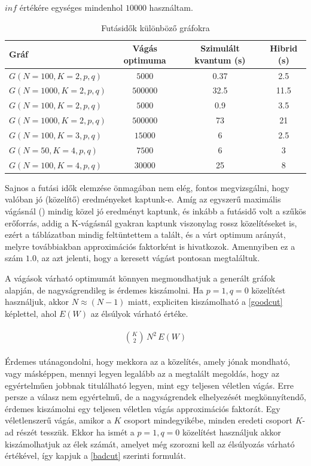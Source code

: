 $inf$ értékére egységes mindenhol $10000$ használtam.

\begin{table}[ht]
	\footnotesize
	\centering
	\begin{tabular}{ l c c c }
		\toprule
		Gráf & Vágás optimuma & Szimulált kvantum (s) & Hibrid (s) \\
		\midrule
		$G(N=100, K=2, p, q)$ & $5000$ & 0.37 & 2.5   \\
		$G(N=1000, K=2, p, q)$ & $500000$ & 32.5 & 11.5 \\
		$G(N=100, K=2, p, q)$ & $5000$ & 0.9 & 3.5  \\
		$G(N=1000, K=2, p, q)$ & $500000$ & 73 & 21 \\	
		$G(N=100, K=3, p, q)$ & $15000$ & 6 & 2.5 \\		
		$G(N=50, K=4, p, q)$ & $7500$ & 6 & 3 \\		
		$G(N=100, K=4, p, q)$ & $30000$ & 25 & 8 \\

		\bottomrule
	\end{tabular}
	\caption{Futásidők különböző gráfokra}
	\label{tab:TabularExample}
\end{table}

Sajnos a futási idők elemzése önmagában nem elég, fontos megvizsgálni, hogy valóban jó (közelítő) eredményeket kaptunk-e. Amíg az egyszerű maximális vágásnál () mindig közel jó eredményt kaptunk, és inkább a futásidő volt a szűkös erőforrás, addig a K-vágásnál gyakran kaptunk viszonylag rossz közelítéseket is, ezért a táblázatban mindig feltüntettem a talált, és a várt optimum arányát, melyre továbbiakban approximációs faktorként is hivatkozok. Amennyiben ez a szám $1.0$, az azt jelenti, hogy a keresett vágást pontosan megtaláltuk.


A vágások várható optimumát könnyen megmondhatjuk a generált gráfok alapján, de nagyságrendileg is érdemes kiszámolni. Ha $p=1, q=0$ közelítést használjuk, akkor $N \approx (N-1)$ miatt, expliciten kiszámolható a \ref{goodcut} képlettel, ahol $E(W)$ az élsúlyok várható értéke.

\begin{align}
	\begin{split}
		\binom{K}{2} \, N^2 \, E(W) \label{goodcut}		
	\end{split}
\end{align}

Érdemes utánagondolni, hogy mekkora az a közelítés, amely jónak mondható, vagy másképpen, mennyi legyen legalább az a megtalált megoldás, hogy az egyértelműen jobbnak titulálható legyen, mint egy teljesen véletlen vágás. Erre persze a válasz nem egyértelmű, de a nagyságrendek elhelyezését megkönnyítendő, érdemes kiszámolni egy teljesen véletlen vágás approximációs faktorát. Egy véletlenszerű vágás, amikor a $K$ csoport mindegyikébe, minden eredeti csoport $K$-ad részét tesszük. Ekkor ha ismét a $p=1, q=0$ közelítést használjuk akkor kiszámolhatjuk az élek számát, amelyet még szorozni kell az élsúlyozás várható értékével, így kapjuk a \ref{badcut} szerinti formulát. 

